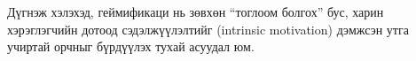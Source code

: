 \begin{sloppy}
Дүгнэж хэлэхэд, геймификаци нь зөвхөн ``тоглоом болгох'' бус, харин хэрэглэгчийн дотоод сэдэлжүүлэлтийг (intrinsic motivation) дэмжсэн утга учиртай орчныг бүрдүүлэх тухай асуудал юм.

\end{sloppy}
